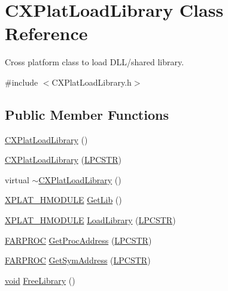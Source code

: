 \hypertarget{class_c_x_plat_load_library}{\section{\-C\-X\-Plat\-Load\-Library \-Class \-Reference}
\label{class_c_x_plat_load_library}
}


\-Cross platform class to load \-D\-L\-L/shared library.  




{\ttfamily \#include $<$\-C\-X\-Plat\-Load\-Library.\-h$>$}

\subsection*{\-Public \-Member \-Functions}
\begin{DoxyCompactItemize}
\item 
\hyperlink{class_c_x_plat_load_library_abe816cad318d8e04ac06b17f781c75f2}{\-C\-X\-Plat\-Load\-Library} ()
\item 
\hyperlink{class_c_x_plat_load_library_a2166a1d54085a7a413d3f2bfbaab84ff}{\-C\-X\-Plat\-Load\-Library} (\hyperlink{_x_plat_8h_a2b72c6037793f6c6381a09c83f27569b}{\-L\-P\-C\-S\-T\-R})
\item 
virtual \hyperlink{class_c_x_plat_load_library_a778a203a83cb70d1446f59d8e63ee442}{$\sim$\-C\-X\-Plat\-Load\-Library} ()
\item 
\hyperlink{_x_plat_8h_a80165b054b5cfe826b966b7e077811a0}{\-X\-P\-L\-A\-T\-\_\-\-H\-M\-O\-D\-U\-L\-E} \hyperlink{class_c_x_plat_load_library_a9e26d0b51777327e87b0a5f4ccbef428}{\-Get\-Lib} ()
\item 
\hyperlink{_x_plat_8h_a80165b054b5cfe826b966b7e077811a0}{\-X\-P\-L\-A\-T\-\_\-\-H\-M\-O\-D\-U\-L\-E} \hyperlink{class_c_x_plat_load_library_a3fb66b0a51071be6bcac42711fbf2527}{\-Load\-Library} (\hyperlink{_x_plat_8h_a2b72c6037793f6c6381a09c83f27569b}{\-L\-P\-C\-S\-T\-R})
\item 
\hyperlink{_x_plat_8h_a1a431e1aa01f9a53e173ec848dd5b20e}{\-F\-A\-R\-P\-R\-O\-C} \hyperlink{class_c_x_plat_load_library_aba18b85f8705e3340d90a33d0faa1838}{\-Get\-Proc\-Address} (\hyperlink{_x_plat_8h_a2b72c6037793f6c6381a09c83f27569b}{\-L\-P\-C\-S\-T\-R})
\item 
\hyperlink{_x_plat_8h_a1a431e1aa01f9a53e173ec848dd5b20e}{\-F\-A\-R\-P\-R\-O\-C} \hyperlink{class_c_x_plat_load_library_aebd81f68a11e3b1d7a39647332a2c563}{\-Get\-Sym\-Address} (\hyperlink{_x_plat_8h_a2b72c6037793f6c6381a09c83f27569b}{\-L\-P\-C\-S\-T\-R})
\item 
\hyperlink{_cpclient_8h_a6464f7480a0fd0ee170cba12b2c0497f}{void} \hyperlink{class_c_x_plat_load_library_a8aaccf4e19472bf83c5059a44df85951}{\-Free\-Library} ()
\end{DoxyCompactItemize}
